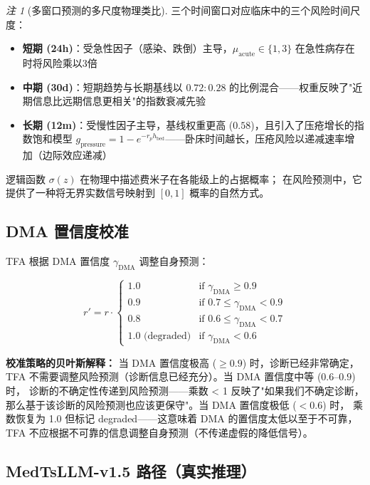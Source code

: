 \documentclass[11pt,a4paper]{ctexart}
\theoremstyle{remark}
\newtheorem{remark}{注}[section]
\begin{document}
\begin{remark}[多窗口预测的多尺度物理类比]
三个时间窗口对应临床中的三个风险时间尺度：
\begin{itemize}[nosep]
\item \textbf{短期 (24h)}：受急性因子（感染、跌倒）主导，$\mu_{\text{acute}} \in \{1,3\}$ 在急性病存在时将风险乘以3倍
\item \textbf{中期 (30d)}：短期趋势与长期基线以 $0.72:0.28$ 的比例混合——权重反映了"近期信息比远期信息更相关"的指数衰减先验
\item \textbf{长期 (12m)}：受慢性因子主导，基线权重更高 ($0.58$)，且引入了压疮增长的指数饱和模型 $g_{\text{pressure}} = 1 - e^{-r_p h_{\text{bed}}}$——卧床时间越长，压疮风险以递减速率增加（边际效应递减）
\end{itemize}
逻辑函数 $\sigma(z)$ 在物理中描述费米子在各能级上的占据概率；
在风险预测中，它提供了一种将无界实数信号映射到 $[0,1]$ 概率的自然方式。
\end{remark}

\subsection{DMA 置信度校准}

TFA 根据 DMA 置信度 $\gamma_{\text{DMA}}$ 调整自身预测：

\begin{equation}
r' = r \cdot
\begin{cases}
1.0 & \text{if } \gamma_{\text{DMA}} \geq 0.9 \\
0.9 & \text{if } 0.7 \leq \gamma_{\text{DMA}} < 0.9 \\
0.8 & \text{if } 0.6 \leq \gamma_{\text{DMA}} < 0.7 \\
1.0 \text{ (degraded)} & \text{if } \gamma_{\text{DMA}} < 0.6
\end{cases}
\end{equation}

\textbf{校准策略的贝叶斯解释：} 当 DMA 置信度极高 ($\geq 0.9$) 时，诊断已经非常确定，
TFA 不需要调整风险预测（诊断信息已经充分）。当 DMA 置信度中等 ($0.6$--$0.9$) 时，
诊断的不确定性传递到风险预测——乘数 < 1 反映了"如果我们不确定诊断，
那么基于该诊断的风险预测也应该更保守"。当 DMA 置信度极低 ($< 0.6$) 时，
乘数恢复为 1.0 但标记 degraded——这意味着 DMA 的置信度太低以至于不可靠，
TFA 不应根据不可靠的信息调整自身预测（不传递虚假的降低信号）。

\subsection{MedTsLLM-v1.5 路径（真实推理）}
\end{document}
